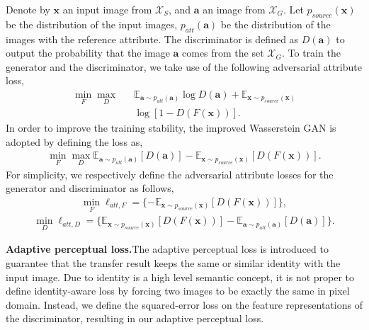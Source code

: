 \documentclass[journal]{IEEEtran}
\begin{document}
Denote by $\mathbf{x}$ an input image from $\mathcal{X}_S$, and $\mathbf{a}$ an image from $\mathcal{X}_G$.
Let $p_{source}(\mathbf{x})$ be the distribution of the input images, $p_{att}(\mathbf{a})$ be the distribution of the images with the reference attribute.
The discriminator is defined as $D(\mathbf{a})$ to output the probability that the image $\mathbf{a}$ comes from the set $\mathcal{X}_G$.
To train the generator and the discriminator, we take use of the following adversarial attribute loss,
\begin{eqnarray}\label{gan}
  \min\limits_F\max\limits_D&&\mathbb{E}_{ \mathbf{a} \sim p_{att}(\mathbf{a})} \log D(\mathbf{a}) + \mathbb{E}_{\mathbf{x}\sim p_{source}(\mathbf{x})}\nonumber\\
  &&\log [1-D(F(\mathbf{x}))].
\end{eqnarray}
In order to improve the training stability, the improved Wasserstein GAN is adopted by defining the loss as,
\begin{eqnarray}\label{gan_wass}
  \min\limits_F\max\limits_D\mathbb{E}_{ \mathbf{a} \sim p_{att}(\mathbf{a})}[ D(\mathbf{a})]- \mathbb{E}_{\mathbf{x}\sim p_{source}(\mathbf{x})}
  [ D(F(\mathbf{x}))].
\end{eqnarray}
For simplicity, we respectively define the adversarial attribute losses for the generator and discriminator as follows,
\begin{eqnarray}\label{gan_generator}
  \min\limits_F  \ell_{att,F} = \{ - \mathbb{E}_{\mathbf{x}\sim p_{source}(\mathbf{x})}
  [ D(F(\mathbf{x}))]\},
\end{eqnarray}
\begin{eqnarray}\label{gan_disc}
  \min\limits_D  \ell_{att,D} \!=\!  \{\mathbb{E}_{\mathbf{x}\sim p_{source}(\mathbf{x})} [ D(F(\mathbf{x}))] - \mathbb{E}_{ \mathbf{a} \sim p_{att}(\mathbf{a})}[ D(\mathbf{a})] \}.
\end{eqnarray}



\textbf{Adaptive perceptual loss.}\quad  The adaptive perceptual loss is introduced to guarantee that the transfer result keeps the same or similar identity with the input image.
Due to identity is a high level semantic concept, it is not proper to define identity-aware loss by forcing two images to be exactly the same in pixel domain.
Instead, we define the squared-error loss on the feature representations of the discriminator, resulting in our adaptive perceptual loss.
\end{document}
